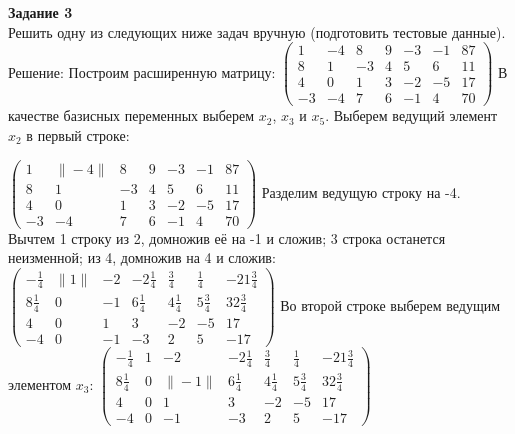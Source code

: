 \documentclass[a4paper,14pt]{extarticle}
\begin{document}
\textbf{Задание 3}\\
Решить одну из следующих ниже задач вручную (подготовить тестовые данные).\bigbreak
Решение:
Построим расширенную матрицу:\bigbreak
$\begin{pmatrix}
        1  & -4 & 8  & 9 & -3 & -1 & 87 \\
        8  & 1  & -3 & 4 & 5  & 6  & 11 \\
        4  & 0  & 1  & 3 & -2 & -5 & 17 \\
        -3 & -4 & 7  & 6 & -1 & 4  & 70
    \end{pmatrix}$\bigbreak
В качестве базисных переменных выберем $x_2$, $x_3$ и $x_5$. Выберем ведущий элемент $x_2$ в первый строке:\bigbreak

$\begin{pmatrix}
        1  & \|-4\| & 8  & 9 & -3 & -1 & 87 \\
        8  & 1      & -3 & 4 & 5  & 6  & 11 \\
        4  & 0      & 1  & 3 & -2 & -5 & 17 \\
        -3 & -4     & 7  & 6 & -1 & 4  & 70
    \end{pmatrix}$\bigbreak
Разделим ведущую строку на -4. Вычтем 1 строку из 2, домножив её на -1 и сложив; 3 строка останется неизменной; из 4, домножив на 4 и сложив:\bigbreak
$\begin{pmatrix}
        -\frac{1}{4} & \|1\| & -2 & -2\frac{1}{4} & \frac{3}{4}  & \frac{1}{4}  & -21\frac{3}{4} \\
        8\frac{1}{4} & 0     & -1 & 6\frac{1}{4}  & 4\frac{1}{4} & 5\frac{3}{4} & 32\frac{3}{4}  \\
        4            & 0     & 1  & 3             & -2           & -5           & 17             \\
        -4           & 0     & -1 & -3            & 2            & 5            & -17
    \end{pmatrix}$\bigbreak
Во второй строке выберем ведущим элементом $x_3$:\bigbreak
$\begin{pmatrix}
        -\frac{1}{4} & 1 & -2     & -2\frac{1}{4} & \frac{3}{4}  & \frac{1}{4}  & -21\frac{3}{4} \\
        8\frac{1}{4} & 0 & \|-1\| & 6\frac{1}{4}  & 4\frac{1}{4} & 5\frac{3}{4} & 32\frac{3}{4}  \\
        4            & 0 & 1      & 3             & -2           & -5           & 17             \\
        -4           & 0 & -1     & -3            & 2            & 5            & -17
    \end{pmatrix}$\bigbreak
\end{document}
